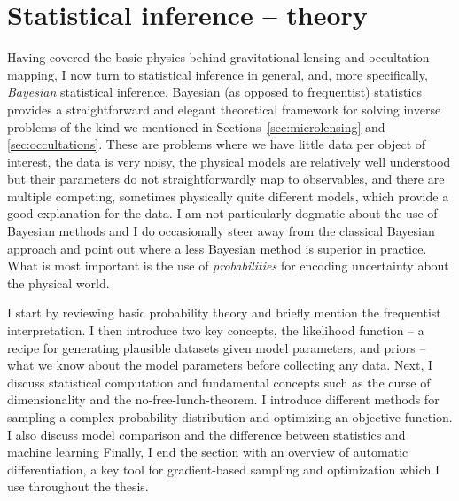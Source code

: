 \documentclass[12pt,dvipsnames]{report}
\begin{document}
\section{Statistical inference -- theory}
\label{sec:inference_intro}
Having covered the basic physics behind gravitational lensing and occultation mapping, I
now turn to statistical inference in general, and, more specifically,
\emph{Bayesian} statistical inference. Bayesian (as opposed to frequentist) statistics
provides a straightforward and elegant theoretical framework for solving inverse
problems of the kind we mentioned
in Sections~\ref{sec:microlensing}  and \ref{sec:occultations}. These are problems
where we have little data per object of interest, the data is very noisy,
the physical models are relatively well understood but their parameters do not
straightforwardly map to observables, and there are multiple competing, sometimes
physically  quite different models, which provide a good explanation for the data.
I am not particularly dogmatic about the use of Bayesian methods
and I do occasionally steer away from the classical Bayesian approach and point out where
a less Bayesian method is superior in practice.  What is most important is the
use of \emph{probabilities} for encoding uncertainty about the physical world.

I start by reviewing basic probability theory and briefly mention the
frequentist interpretation. I then introduce two key concepts, the likelihood
function -- a recipe for generating plausible datasets given model parameters,
and priors -- what we know about the model parameters before collecting any
data. Next, I discuss statistical computation and fundamental concepts such as the curse of
dimensionality and the no-free-lunch-theorem. I introduce different methods for sampling 
a complex probability distribution and optimizing an objective function. 
I also discuss model comparison and the difference between statistics and machine learning
Finally, I end the section with an overview of automatic differentiation, a key tool 
for gradient-based sampling and optimization which I use throughout the thesis.
\end{document}
